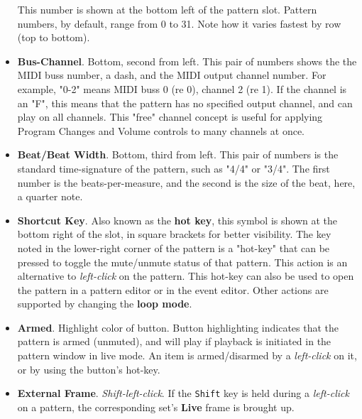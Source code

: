 \begin{itemize}
         This number is shown at the bottom left of the pattern slot.
         Pattern numbers, by default, range from 0 to 31.
         Note how it varies fastest by row (top to bottom).
      \item \textbf{Bus-Channel}. Bottom, second from left.
         This pair of numbers shows the the MIDI buss number, a dash, and
         the MIDI output channel number.
         For example, "0-2" means MIDI buss 0 (re 0), channel 2 (re 1).
         If the channel is an "F", this means that the pattern has no specified
         output channel, and can play on all channels.
         This "free" channel concept is useful for applying Program Changes and
         Volume controls to many channels at once.
      \item \textbf{Beat/Beat Width}. Bottom, third from left.
         This pair of numbers is the standard time-signature of the pattern,
         such as "4/4" or "3/4".  The first number is the beats-per-measure,
         and the second is the size of the beat, here, a quarter note.
      \item \textbf{Shortcut Key}.  Also known as the
         \textbf{hot key}, this symbol is shown at the bottom right of the
         slot, in square brackets for better visibility.
         The key noted in the lower-right corner of the pattern is a "hot-key"
         that can be pressed to toggle the mute/unmute status of that pattern.
         This action is an alternative to
         \textsl{left-click} on the pattern.
         This hot-key can also be used to open the pattern in a pattern editor
         or in the event editor.
         Other actions are supported by changing the 
         \textbf{loop mode}.
      \item \textbf{Armed}. Highlight color of button.
         Button highlighting indicates that the pattern is armed
         (unmuted), and will play if playback is initiated in the pattern
         window in live mode.
         An item is armed/disarmed by a
         \textsl{left-click} on it, or by using the
         button's hot-key.
      \item \textbf{External Frame}. \textsl{Shift-left-click}.
         If the \texttt{Shift} key is held during a
         \textsl{left-click} on a pattern,
         the corresponding set's \textbf{Live} frame is brought up.
   \end{itemize}

